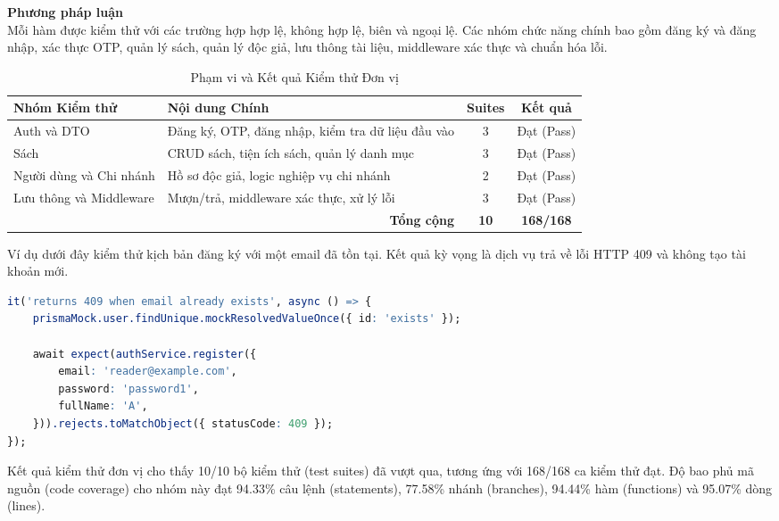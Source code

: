 \noindent \textbf{Phương pháp luận} \\

Mỗi hàm được kiểm thử với các trường hợp hợp lệ, không hợp lệ, biên và ngoại lệ. Các nhóm chức năng chính bao gồm đăng ký và đăng nhập, xác thực OTP, quản lý sách, quản lý độc giả, lưu thông tài liệu, middleware xác thực và chuẩn hóa lỗi.

\begin{table}[H]
\centering
\caption{Phạm vi và Kết quả Kiểm thử Đơn vị}
\begin{tabularx}{\textwidth}{|p{4.2cm}|X|c|c|}
\hline
\textbf{Nhóm Kiểm thử} & \textbf{Nội dung Chính} & \textbf{Suites} & \textbf{Kết quả} \\
\hline
Auth và DTO & Đăng ký, OTP, đăng nhập, kiểm tra dữ liệu đầu vào & 3 & Đạt (Pass) \\
\hline
Sách & CRUD sách, tiện ích sách, quản lý danh mục & 3 & Đạt (Pass) \\
\hline
Người dùng và Chi nhánh & Hồ sơ độc giả, logic nghiệp vụ chi nhánh & 2 & Đạt (Pass) \\
\hline
Lưu thông và Middleware & Mượn/trả, middleware xác thực, xử lý lỗi & 3 & Đạt (Pass) \\
\hline
\multicolumn{2}{|r|}{\textbf{Tổng cộng}} & \textbf{10} & \textbf{168/168} \\
\hline
\end{tabularx}
\end{table}

Ví dụ dưới đây kiểm thử kịch bản đăng ký với một email đã tồn tại. Kết quả kỳ vọng là dịch vụ trả về lỗi HTTP 409 và không tạo tài khoản mới.

\begin{lstlisting}[language=R, caption={Ca kiểm thử đơn vị cho tính năng đăng ký}]
it('returns 409 when email already exists', async () => {
    prismaMock.user.findUnique.mockResolvedValueOnce({ id: 'exists' });

    await expect(authService.register({
        email: 'reader@example.com',
        password: 'password1',
        fullName: 'A',
    })).rejects.toMatchObject({ statusCode: 409 });
});
\end{lstlisting}

Kết quả kiểm thử đơn vị cho thấy 10/10 bộ kiểm thử (test suites) đã vượt qua, tương ứng với 168/168 ca kiểm thử đạt. Độ bao phủ mã nguồn (code coverage) cho nhóm này đạt 94.33\% câu lệnh (statements), 77.58\% nhánh (branches), 94.44\% hàm (functions) và 95.07\% dòng (lines). \\

